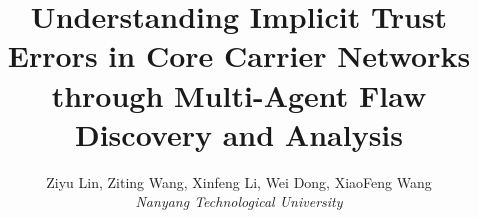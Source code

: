 \documentclass[letterpaper,twocolumn,10pt]{article}
\begin{document}
\date{}

\title{\Large Understanding Implicit Trust Errors in Core Carrier Networks through Multi-Agent Flaw Discovery and Analysis}





\author{
  Ziyu Lin, Ziting Wang, Xinfeng Li, Wei Dong, XiaoFeng Wang \\
  \textit{Nanyang Technological University} \\
}

\maketitle





\thispagestyle{empty}






















\normalem

\end{document}
